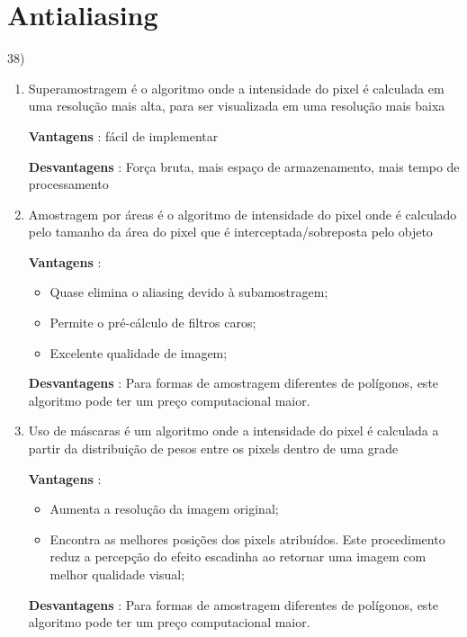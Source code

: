 \section*{Antialiasing}

 	        38) \begin{enumerate}[label=\alph*.]
					\setlength\itemsep{1em}
		
					\item Superamostragem é o algoritmo onde a intensidade do pixel é calculada em uma resolução
					mais alta, para ser visualizada em uma resolução mais baixa
					
					\textbf{Vantagens} :  fácil de implementar
					
					\textbf{Desvantagens} : Força bruta, mais espaço de armazenamento, mais
					tempo de processamento
		
					\item Amostragem por áreas é o algoritmo de intensidade do pixel onde é calculado pelo tamanho da 	área do pixel que é interceptada/sobreposta pelo objeto
					
					\textbf{Vantagens} : 
					
					\begin{itemize}
							\item Quase elimina o aliasing devido à subamostragem;
							\item Permite o pré-cálculo de filtros caros;
							\item Excelente qualidade de imagem;
					\end{itemize}
																 
					\textbf{Desvantagens} : Para formas de amostragem diferentes de polígonos, 
					este algoritmo pode ter um preço computacional maior.
		
					\item Uso de máscaras é um algoritmo onde a intensidade do pixel é calculada a partir
					da distribuição de pesos entre os pixels dentro de uma grade
					
					\textbf{Vantagens} :  \begin{itemize}
						\item Aumenta a resolução da imagem original;
						\item Encontra  as  melhores  posições  dos  pixels  atribuídos.  Este  procedimento reduz  a percepção do efeito escadinha ao retornar uma imagem com melhor qualidade visual;
					\end{itemize}
					
					\textbf{Desvantagens} : Para formas de amostragem diferentes de polígonos, 
					este algoritmo pode ter um preço computacional maior.
					

\end{enumerate}
